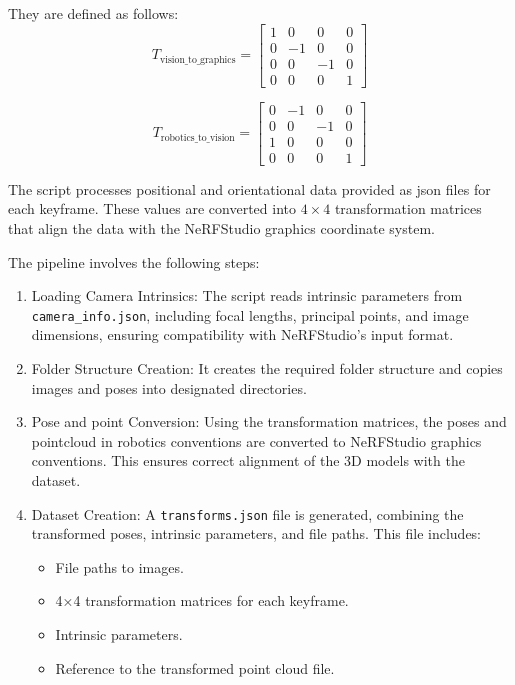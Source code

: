 They are defined as follows:
\[
T_\text{vision\_to\_graphics} = \begin{bmatrix}
1 & 0 & 0 & 0 \\
0 & -1 & 0 & 0 \\
0 & 0 & -1 & 0 \\
0 & 0 & 0 & 1
\end{bmatrix}
\]

\[
T_\text{robotics\_to\_vision} = \begin{bmatrix}
0 & -1 & 0 & 0 \\
0 & 0 & -1 & 0 \\
1 & 0 & 0 & 0 \\
0 & 0 & 0 & 1
\end{bmatrix}
\]

The script processes positional and orientational data provided as json files for each keyframe. These values are converted into \(4\times4\) transformation matrices that align the data with the NeRFStudio graphics coordinate system.

The pipeline involves the following steps:
\begin{enumerate}
    \item Loading Camera Intrinsics: The script reads intrinsic parameters from \verb|camera_info.json|, including focal lengths, principal points, and image dimensions, ensuring compatibility with NeRFStudio's input format.
    \item Folder Structure Creation: It creates the required folder structure and copies images and poses into designated directories.
    \item Pose and point Conversion: Using the transformation matrices, the poses and pointcloud in robotics conventions are converted to NeRFStudio graphics conventions. This ensures correct alignment of the 3D models with the dataset.
    \item Dataset Creation: A \verb|transforms.json| file is generated, combining the transformed poses, intrinsic parameters, and file paths. This file includes:
    \begin{itemize}
        \item File paths to images.
        \item 4×4 transformation matrices for each keyframe.
        \item Intrinsic parameters.
        \item Reference to the transformed point cloud file.
    \end{itemize}
\end{enumerate}

